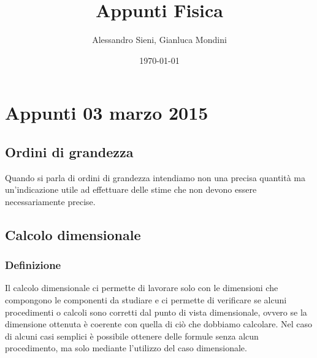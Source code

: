 \documentclass[portait]{article}
\author{Alessandro Sieni, Gianluca Mondini}
\title{Appunti Fisica}
\date{\today}
\begin{document}
\maketitle
\newpage
\tableofcontents
\newpage
\section{Appunti 03 marzo 2015}
\subsection{Ordini di grandezza}
Quando si parla di ordini di grandezza intendiamo non una precisa quantità ma un'indicazione utile ad effettuare delle stime che non devono essere necessariamente precise.
\subsection{Calcolo dimensionale}
\subsubsection{Definizione}
Il calcolo dimensionale ci permette di lavorare solo con le dimensioni che compongono le componenti da studiare e ci permette di verificare se alcuni procedimenti o calcoli sono corretti dal punto di vista dimensionale, ovvero se la dimensione ottenuta è coerente con quella di ciò che dobbiamo calcolare.
Nel caso di alcuni casi semplici è possibile ottenere delle formule senza alcun procedimento, ma solo mediante l'utilizzo del caso dimensionale.
\end{document}
